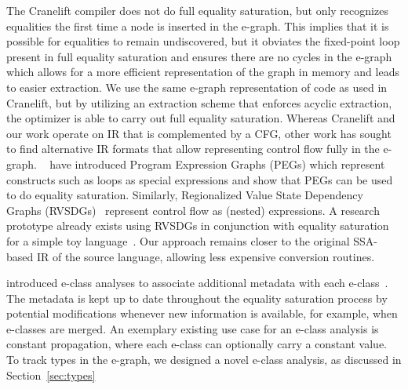 The Cranelift compiler does not do full equality saturation, but only recognizes equalities the first time a node is inserted in the e-graph.
This implies that it is possible for equalities to remain undiscovered, but it obviates the fixed-point loop present in full equality saturation and ensures there are no cycles in the e-graph which allows for a more efficient representation of the graph in memory and leads to easier extraction.
We use the same e-graph representation of code as used in Cranelift, but by utilizing an extraction scheme that enforces acyclic extraction, the optimizer is able to carry out full equality saturation.
Whereas Cranelift and our work operate on IR that is complemented by a CFG, other work has sought to find alternative IR formats that allow representing control flow fully in the e-graph.
\citeauthor{tateEqualitySaturationNew2009}~\cite{tateEqualitySaturationNew2009} have introduced Program Expression Graphs (PEGs) which represent constructs such as loops as special expressions and show that PEGs can be used to do equality saturation.
Similarly, Regionalized Value State Dependency Graphs (RVSDGs)~\cite{bahmannPerfectReconstructabilityControl2015,reissmannRVSDGIntermediateRepresentation2020} represent control flow as (nested) expressions.
A research prototype already exists using RVSDGs in conjunction with equality saturation for a simple toy language~\cite{optir2022}.
Our approach remains closer to the original SSA-based IR of the source language, allowing less expensive conversion routines.

\citeauthor{willseyEggFastExtensible2021} introduced e-class analyses to associate additional metadata with each e-class~\cite{willseyEggFastExtensible2021}. The metadata is kept up to date throughout the equality saturation process by potential modifications whenever new information is available, for example, when e-classes are merged. An exemplary existing use case for an e-class analysis is constant propagation, where each e-class can optionally carry a constant value. To track types in the e-graph, we designed a novel e-class analysis, as discussed in Section~\ref{sec:types}


